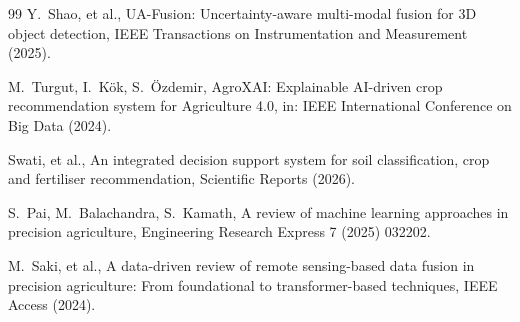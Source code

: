\documentclass[preprint,12pt]{elsarticle}
\begin{document}
\begin{thebibliography}{99}
Y.~Shao, et al.,
UA-Fusion: Uncertainty-aware multi-modal fusion for 3D object detection,
IEEE Transactions on Instrumentation and Measurement (2025).

M.~Turgut, I.~K\"ok, S.~\"Ozdemir,
AgroXAI: Explainable AI-driven crop recommendation system for Agriculture 4.0,
in: IEEE International Conference on Big Data (2024).

Swati, et al.,
An integrated decision support system for soil classification, crop and
fertiliser recommendation,
Scientific Reports (2026).

S.~Pai, M.~Balachandra, S.~Kamath,
A review of machine learning approaches in precision agriculture,
Engineering Research Express 7 (2025) 032202.

M.~Saki, et al.,
A data-driven review of remote sensing-based data fusion in precision
agriculture: From foundational to transformer-based techniques,
IEEE Access (2024).

\end{thebibliography}
\end{document}
